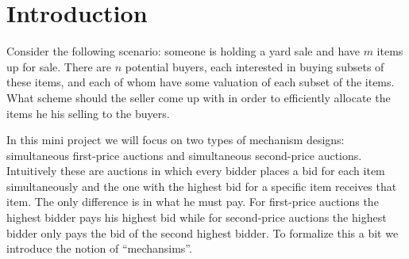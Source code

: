 \section{Introduction} %
\label{sec:Introduction}
Consider the following scenario: someone is holding a yard sale and have $ m $ items up for sale. There are $ n $ potential buyers, each interested in buying subsets of these items, and each of whom have some valuation of each subset of the items. What scheme should the seller come up with in order to efficiently allocate the items he his selling to the buyers.


In this mini project we will focus on two types of mechanism designs: simultaneous first-price auctions and simultaneous second-price auctions. Intuitively these are auctions in which every bidder places a bid for each item simultaneously and the one with the highest bid for a specific item receives that item. The only difference is in what he must pay. For first-price auctions the highest bidder pays his highest bid while for second-price auctions the highest bidder only pays the bid of the second highest bidder. To formalize this a bit we introduce the notion of ``mechansims''.
